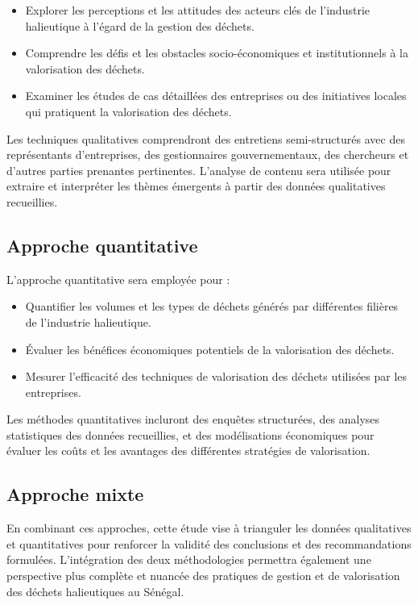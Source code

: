 \documentclass[12pt,a4paper]{report}
\begin{document}
\begin{itemize}
    \item Explorer les perceptions et les attitudes des acteurs clés de l'industrie halieutique à l'égard de la gestion des déchets.
    \item Comprendre les défis et les obstacles socio-économiques et institutionnels à la valorisation des déchets.
    \item Examiner les études de cas détaillées des entreprises ou des initiatives locales qui pratiquent la valorisation des déchets.
\end{itemize}

Les techniques qualitatives comprendront des entretiens semi-structurés avec des représentants d'entreprises, des gestionnaires gouvernementaux, des chercheurs et d'autres parties prenantes pertinentes. L'analyse de contenu sera utilisée pour extraire et interpréter les thèmes émergents à partir des données qualitatives recueillies.

\subsection{Approche quantitative}

L'approche quantitative sera employée pour :

\begin{itemize}
    \item Quantifier les volumes et les types de déchets générés par différentes filières de l'industrie halieutique.
    \item Évaluer les bénéfices économiques potentiels de la valorisation des déchets.
    \item Mesurer l'efficacité des techniques de valorisation des déchets utilisées par les entreprises.
\end{itemize}

Les méthodes quantitatives incluront des enquêtes structurées, des analyses statistiques des données recueillies, et des modélisations économiques pour évaluer les coûts et les avantages des différentes stratégies de valorisation.

\subsection{Approche mixte}

En combinant ces approches, cette étude vise à trianguler les données qualitatives et quantitatives pour renforcer la validité des conclusions et des recommandations formulées. L'intégration des deux méthodologies permettra également une perspective plus complète et nuancée des pratiques de gestion et de valorisation des déchets halieutiques au Sénégal.
\end{document}
